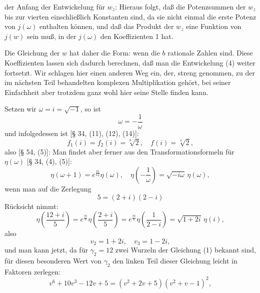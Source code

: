 der Anfang der Entwickelung für $w_z$:
Hieraus folgt, daß die Potenzsummen der $w_z$ bis zur vierten einschließlich Konstanten sind, da sie nicht einmal die erste Potenz von $j(\omega)$ enthalten können, und daß das Produkt der $w_z$ eine  Funktion von $j(w)$ sein muß, %
in der $j(\omega)$ den Koeffizienten 1 hat.

Die Gleichung der $w$ hat daher die Form:
wenn die $b$ rationale Zahlen sind. Diese Koeffizienten lassen sich dadurch berechnen, daß man die Entwickelung (4) weiter fortsetzt. Wir schlagen hier einen anderen Weg ein, der, streng genommen, zu der im nächsten Teil behandelten komplexen Multiplikation gehört, bei seiner Einfachheit aber trotzdem ganz wohl hier seine Stelle finden kann.

Setzen wir $\omega = i = \sqrt{-1}$, so ist
\[ \omega = -\frac{1}{\omega} \]
und infolgedessen ist [§ 34, (11), (12), (14)]:
\[ f_1(i) = f_2(i) = \sqrt[8]{2}, \quad f(i) = \sqrt[4]{2}, \]
also [§ 54, (5)]:
Man findet aber ferner aus den Transformationsformeln für $\eta(\omega)$ [§ 34, (4), (5)]:
\[ \eta(\omega+1) = e^{\frac{\pi i}{12}} \eta(\omega), \quad \eta\left(-\frac{1}{\omega}\right) = \sqrt{-i\omega}\,\eta(\omega), \]
wenn man auf die Zerlegung
\[ 5 = (2+i)(2-i) \]
Rücksicht nimmt:
\[ \eta\left(\frac{12+i}{5}\right) = e^{\frac{\pi i}{6}} \eta\left(\frac{2+i}{5}\right) = e^{\frac{\pi i}{6}} \eta\left(\frac{1}{2-i}\right) = \sqrt{1+2i}\,\eta(i), \]
also
\[ v_2 = 1+2i, \quad v_3 = 1-2i, \]
und man kann jetzt, da für $\gamma_2 = 12$ zwei Wurzeln der Gleichung (1) bekannt sind, für diesen besonderen Wert von $\gamma_2$ den linken Teil dieser Gleichung leicht in Faktoren zerlegen:
\[ v^6 + 10v^3 - 12v + 5 = (v^2+2v+5)(v^2+v-1)^2, \]
